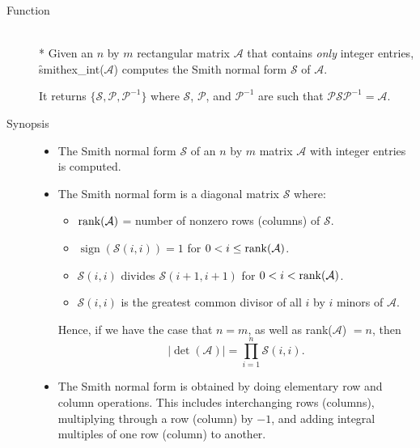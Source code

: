 \begin{description}
\item[Function]\mbox{}\\*
Given an $n$ by $m$ rectangular matrix $\mathcal{A}$ that contains 
\emph{only} integer entries, \f{smithex\_int}($\mathcal{A}$) computes the
Smith normal form $\mathcal{S}$ of $\mathcal{A}$.

It returns $\{\mathcal{S}, \mathcal{P}, \mathcal{ P}^{-1}\}$ where $\mathcal{S}$,
$\mathcal{P}$, and $\mathcal{ P}^{-1}$ are such that $\mathcal{P S P}^{-1} = 
\mathcal{A}$.


\item[Synopsis]

\begin{itemize}
\item The Smith normal form $\mathcal{ S}$ of an $n$ by $m$ matrix 
$\mathcal{ A}$ with integer entries is computed.

\item The Smith normal form is a diagonal matrix $\mathcal{ S}$ where:

  \begin{itemize}
  \item $\mathop{\mathrm{rank}}(\mathcal{A})$ = number of nonzero rows (columns) of 
        $\mathcal{S}$.
  \item $\mathop{\mathrm{sign}}(\mathcal{S}(i,i)) = 1$ for $0 < i \leq \mathop{\mathrm{rank}}(\mathcal{A})$.
  \item $\mathcal{S}(i,i)$ divides $\mathcal{S}(i+1,i+1)$ for $0< i < \mathop{\mathrm{rank}}(\mathcal{A})$.
  \item $\mathcal{S}(i,i)$ is the greatest common divisor of all $i$ by 
        $i$ minors of $\mathcal{A}$.
  \end{itemize}

      Hence, if we have the case that $n = m$, as well as 
      rank($\mathcal{A}$) $= n$, then 
      \begin{displaymath}
        \left|\det(\mathcal{A})\right| = \prod_{i=1}^{n} \mathcal{S}(i,i) .
      \end{displaymath}
      
\item The Smith normal form is obtained by doing elementary row and 
      column operations. This includes interchanging rows (columns),
      multiplying through a row (column) by $-1$, and adding integral 
      multiples of one row (column) to another. 
\end{itemize}


\end{description}
